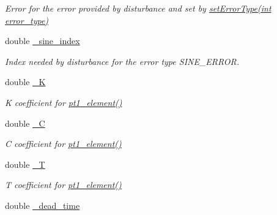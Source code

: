 \begin{DoxyCompactItemize}
\begin{DoxyCompactList}\small\item\em \-Error for the error provided by disturbance and set by \hyperlink{classQuadRotorDynamics_adec8d18d4ce8bad0197501773fa7e6ea}{set\-Error\-Type(int error\-\_\-type)} \end{DoxyCompactList}\item 
\hypertarget{classQuadRotorDynamics_a076bfa86519993cb1fa9c1a6f49c05e2}{double \hyperlink{classQuadRotorDynamics_a076bfa86519993cb1fa9c1a6f49c05e2}{\-\_\-sine\-\_\-index}}\label{classQuadRotorDynamics_a076bfa86519993cb1fa9c1a6f49c05e2}

\begin{DoxyCompactList}\small\item\em \-Index needed by disturbance for the error type \-S\-I\-N\-E\-\_\-\-E\-R\-R\-O\-R. \end{DoxyCompactList}\item 
\hypertarget{classQuadRotorDynamics_aa804817d487b3fa1b8bd8f8ff6201565}{double \hyperlink{classQuadRotorDynamics_aa804817d487b3fa1b8bd8f8ff6201565}{\-\_\-\-K}}\label{classQuadRotorDynamics_aa804817d487b3fa1b8bd8f8ff6201565}

\begin{DoxyCompactList}\small\item\em \-K coefficient for \hyperlink{classQuadRotorDynamics_a9755a314e2c4d7abc54135bb127b8d75}{pt1\-\_\-element()} \end{DoxyCompactList}\item 
\hypertarget{classQuadRotorDynamics_a229de7528658128afa2f0aed504efad5}{double \hyperlink{classQuadRotorDynamics_a229de7528658128afa2f0aed504efad5}{\-\_\-\-C}}\label{classQuadRotorDynamics_a229de7528658128afa2f0aed504efad5}

\begin{DoxyCompactList}\small\item\em \-C coefficient for \hyperlink{classQuadRotorDynamics_a9755a314e2c4d7abc54135bb127b8d75}{pt1\-\_\-element()} \end{DoxyCompactList}\item 
\hypertarget{classQuadRotorDynamics_a25e1b881d7501ccba3bc213896f62e05}{double \hyperlink{classQuadRotorDynamics_a25e1b881d7501ccba3bc213896f62e05}{\-\_\-\-T}}\label{classQuadRotorDynamics_a25e1b881d7501ccba3bc213896f62e05}

\begin{DoxyCompactList}\small\item\em \-T coefficient for \hyperlink{classQuadRotorDynamics_a9755a314e2c4d7abc54135bb127b8d75}{pt1\-\_\-element()} \end{DoxyCompactList}\item 
\hypertarget{classQuadRotorDynamics_ab9c5ae3b9d8a1d582486488dd9682a75}{double \hyperlink{classQuadRotorDynamics_ab9c5ae3b9d8a1d582486488dd9682a75}{\-\_\-dead\-\_\-time}}\label{classQuadRotorDynamics_ab9c5ae3b9d8a1d582486488dd9682a75}


\end{DoxyCompactItemize}
